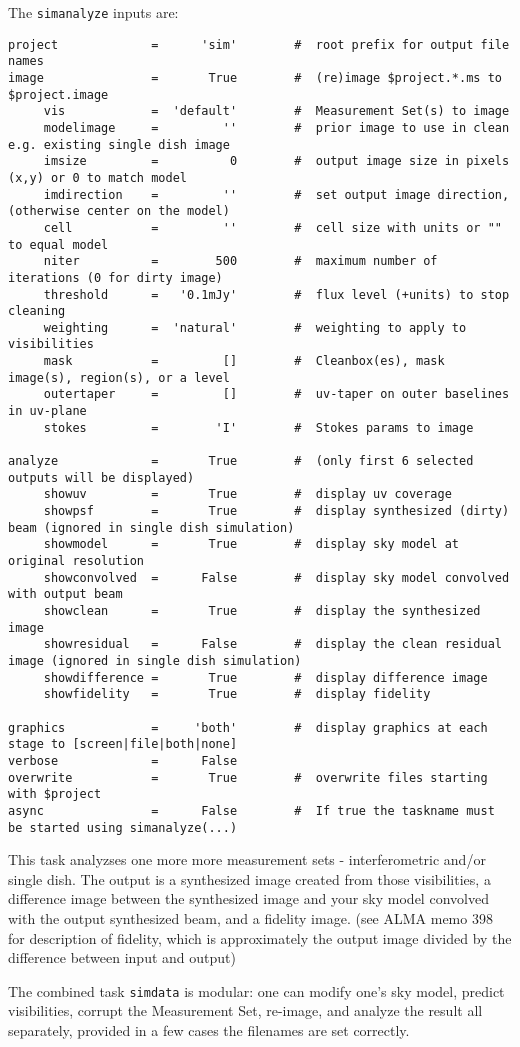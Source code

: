 The {\tt simanalyze} inputs are:
\small
\begin{verbatim}
project             =      'sim'        #  root prefix for output file names
image               =       True        #  (re)image $project.*.ms to $project.image
     vis            =  'default'        #  Measurement Set(s) to image
     modelimage     =         ''        #  prior image to use in clean e.g. existing single dish image
     imsize         =          0        #  output image size in pixels (x,y) or 0 to match model
     imdirection    =         ''        #  set output image direction, (otherwise center on the model)
     cell           =         ''        #  cell size with units or "" to equal model
     niter          =        500        #  maximum number of iterations (0 for dirty image)
     threshold      =   '0.1mJy'        #  flux level (+units) to stop cleaning
     weighting      =  'natural'        #  weighting to apply to visibilities
     mask           =         []        #  Cleanbox(es), mask image(s), region(s), or a level
     outertaper     =         []        #  uv-taper on outer baselines in uv-plane
     stokes         =        'I'        #  Stokes params to image

analyze             =       True        #  (only first 6 selected outputs will be displayed)
     showuv         =       True        #  display uv coverage
     showpsf        =       True        #  display synthesized (dirty) beam (ignored in single dish simulation)
     showmodel      =       True        #  display sky model at original resolution
     showconvolved  =      False        #  display sky model convolved with output beam
     showclean      =       True        #  display the synthesized image
     showresidual   =      False        #  display the clean residual image (ignored in single dish simulation)
     showdifference =       True        #  display difference image
     showfidelity   =       True        #  display fidelity

graphics            =     'both'        #  display graphics at each stage to [screen|file|both|none]
verbose             =      False        
overwrite           =       True        #  overwrite files starting with $project
async               =      False        #  If true the taskname must be started using simanalyze(...)
\end{verbatim}
\normalsize

This task analyzses one more more measurement sets - interferometric and/or single dish.
The output is a synthesized image created from those visibilities, a difference image
between the synthesized image and your sky model convolved with the
output synthesized beam, and a fidelity image. (see ALMA memo 398 for
description of fidelity, which is approximately the output image
divided by the difference between input and output)

The combined task {\tt simdata} is modular: one can
modify one's sky model, predict visibilities, corrupt the Measurement
Set, re-image, and analyze the result all separately, provided in a
few cases the filenames are set correctly.  
